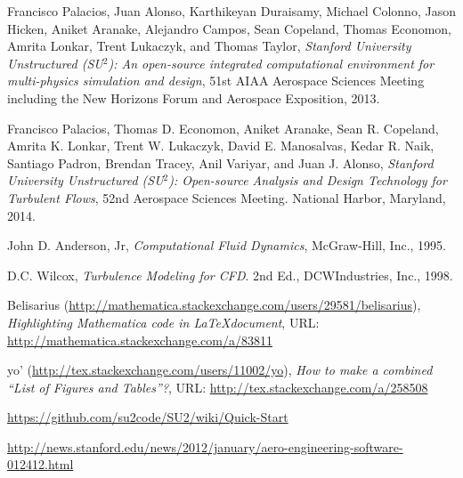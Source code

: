 \documentclass[10pt, titlepage]{article}
\begin{document}
\begin{thebibliography}{9}

Francisco Palacios, Juan Alonso, Karthikeyan Duraisamy, Michael Colonno, Jason Hicken, Aniket Aranake, Alejandro Campos, Sean Copeland, Thomas Economon, Amrita Lonkar, Trent Lukaczyk, and Thomas Taylor, \emph{Stanford University Unstructured (SU$^2$): An open-source integrated computational environment for multi-physics simulation and design}, 51st AIAA Aerospace Sciences Meeting including the New Horizons Forum and Aerospace Exposition, 2013.

Francisco Palacios, Thomas D. Economon, Aniket Aranake, Sean R. Copeland, Amrita K. Lonkar, Trent W. Lukaczyk, David E. Manosalvas, Kedar R. Naik, Santiago Padron, Brendan Tracey, Anil Variyar, and Juan J. Alonso, \emph{Stanford University Unstructured (SU$^2$): Open-source Analysis and Design Technology for Turbulent Flows}, 52nd Aerospace Sciences Meeting. National Harbor, Maryland, 2014.

John D. Anderson, Jr, \emph{Computational Fluid Dynamics}, McGraw-Hill, Inc., 1995.

D.C. Wilcox, \emph{Turbulence Modeling for CFD}. 2nd Ed., DCWIndustries, Inc., 1998.

Belisarius (\url{http://mathematica.stackexchange.com/users/29581/belisarius}), \emph{Highlighting Mathematica code in \LaTeX document}, URL: \url{http://mathematica.stackexchange.com/a/83811}

yo' (\url{http://tex.stackexchange.com/users/11002/yo}), \emph{How to make a combined “List of Figures and Tables”?}, URL: \url{http://tex.stackexchange.com/a/258508}

\url{https://github.com/su2code/SU2/wiki/Quick-Start}

\url{http://news.stanford.edu/news/2012/january/aero-engineering-software-012412.html}

\end{thebibliography}
\end{document}
